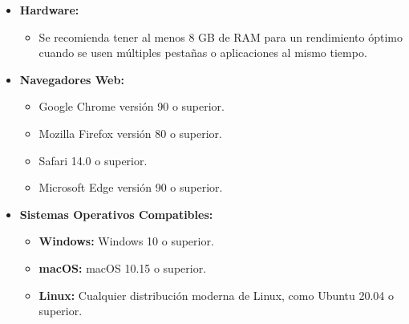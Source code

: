 \begin{itemize}

    \item \textbf{Hardware:}
    \begin{itemize}
        \item Se recomienda tener al menos 8 GB de RAM para un rendimiento óptimo cuando se usen múltiples pestañas o aplicaciones al mismo tiempo.
    \end{itemize}

   \item \textbf{Navegadores Web:}
    \begin{itemize}
        \item Google Chrome versión 90 o superior.
        \item Mozilla Firefox versión 80 o superior.
        \item Safari 14.0 o superior.
        \item Microsoft Edge versión 90 o superior.
    \end{itemize}
    \item \textbf{Sistemas Operativos Compatibles:}
    \begin{itemize}
        \item \textbf{Windows:} Windows 10 o superior.
        \item \textbf{macOS:} macOS 10.15 o superior.
        \item \textbf{Linux:} Cualquier distribución moderna de Linux, como Ubuntu 20.04 o superior.
    \end{itemize}
\end{itemize}
